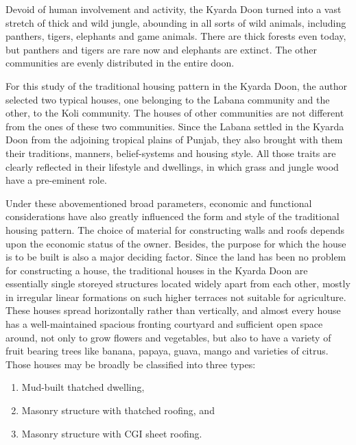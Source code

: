\vskip 2pt

Devoid of human involvement and activity, the Kyarda Doon turned into a vast stretch of thick and wild jungle, abounding in all sorts of wild animals, including panthers, tigers, elephants and game animals. There are thick forests even today, but panthers and tigers are rare now and elephants are extinct. The other communities are evenly distributed in the entire doon.

\vskip 2pt

For this study of the traditional housing pattern in the Kyarda Doon, the author selected two typical houses, one belonging to the Labana community and the other, to the Koli community. The houses of other communities are not different from the ones of these two communities. Since the Labana settled in the Kyarda Doon from the adjoining tropical plains of Punjab, they also brought with them their traditions, manners, belief-systems and housing style. All those traits are clearly reflected in their lifestyle and dwellings, in which grass and jungle wood have a pre-eminent role.

Under these abovementioned broad parameters, economic and functional considerations have also greatly influenced the form and style of the traditional housing pattern. The choice of material for constructing walls and roofs depends upon the economic status of the owner. Besides, the purpose for which the house is to be built is also a major deciding factor. Since the land has been no problem for constructing a house, the traditional houses in the Kyarda Doon are essentially single storeyed structures located widely apart from each other, mostly in irregular linear formations on such higher terraces not suitable for agriculture. These houses spread horizontally rather than vertically, and almost every house has a well-maintained spacious fronting courtyard and sufficient open space around, not only to grow flowers and vegetables, but also to have a variety of fruit bearing trees like banana, papaya, guava, mango and varieties of citrus. Those houses may be broadly be classified into three types:

\begin{enumerate}
\item Mud-built thatched dwelling,

 \item Masonry structure with thatched roofing, and

 \item Masonry structure with CGI sheet roofing.

\end{enumerate}

